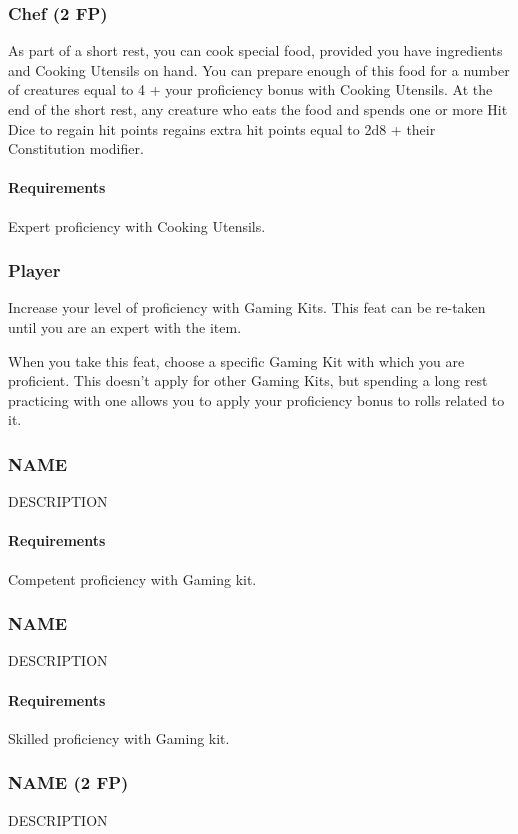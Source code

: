 \subsubsection{Chef (2 FP)} \label{feat::chef}
    As part of a short rest, you can cook special food, provided you have ingredients and Cooking Utensils on hand.
    You can prepare enough of this food for a number of creatures equal to 4 + your proficiency bonus with Cooking Utensils.
    At the end of the short rest, any creature who eats the food and spends one or more Hit Dice to regain hit points regains extra hit points equal to 2d8 + their Constitution modifier.
    \paragraph{Requirements} Expert proficiency with Cooking Utensils.
\subsubsection{Player} \label{feat::player}
    Increase your level of proficiency with Gaming Kits.
    This feat can be re-taken until you are an expert with the item.

    When you take this feat, choose a specific Gaming Kit with which you are proficient.
    This doesn't apply for other Gaming Kits, but spending a long rest practicing with one allows you to apply your proficiency bonus to rolls related to it.
\subsubsection{NAME} \label{feat::name}
    DESCRIPTION
    \paragraph{Requirements} Competent proficiency with Gaming kit.
\subsubsection{NAME} \label{feat::name}
    DESCRIPTION
    \paragraph{Requirements} Skilled proficiency with Gaming kit.
\subsubsection{NAME (2 FP)} \label{feat::name}
    DESCRIPTION
